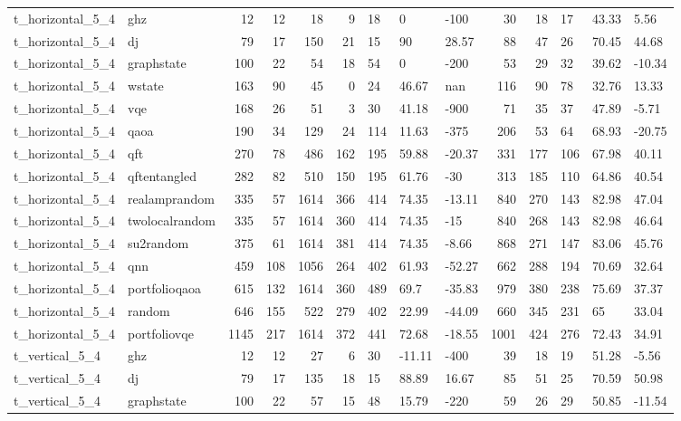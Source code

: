 \begin{longtable}{llrrrrlllrrlll}
t\_horizontal\_5\_4 & ghz & 12 & 12 & 18 & 9 & 18 & 0 & -100 & 30 & 18 & 17 & 43.33 & 5.56 \\
t\_horizontal\_5\_4 & dj & 79 & 17 & 150 & 21 & 15 & 90 & 28.57 & 88 & 47 & 26 & 70.45 & 44.68 \\
t\_horizontal\_5\_4 & graphstate & 100 & 22 & 54 & 18 & 54 & 0 & -200 & 53 & 29 & 32 & 39.62 & -10.34 \\
t\_horizontal\_5\_4 & wstate & 163 & 90 & 45 & 0 & 24 & 46.67 & nan & 116 & 90 & 78 & 32.76 & 13.33 \\
t\_horizontal\_5\_4 & vqe & 168 & 26 & 51 & 3 & 30 & 41.18 & -900 & 71 & 35 & 37 & 47.89 & -5.71 \\
t\_horizontal\_5\_4 & qaoa & 190 & 34 & 129 & 24 & 114 & 11.63 & -375 & 206 & 53 & 64 & 68.93 & -20.75 \\
t\_horizontal\_5\_4 & qft & 270 & 78 & 486 & 162 & 195 & 59.88 & -20.37 & 331 & 177 & 106 & 67.98 & 40.11 \\
t\_horizontal\_5\_4 & qftentangled & 282 & 82 & 510 & 150 & 195 & 61.76 & -30 & 313 & 185 & 110 & 64.86 & 40.54 \\
t\_horizontal\_5\_4 & realamprandom & 335 & 57 & 1614 & 366 & 414 & 74.35 & -13.11 & 840 & 270 & 143 & 82.98 & 47.04 \\
t\_horizontal\_5\_4 & twolocalrandom & 335 & 57 & 1614 & 360 & 414 & 74.35 & -15 & 840 & 268 & 143 & 82.98 & 46.64 \\
t\_horizontal\_5\_4 & su2random & 375 & 61 & 1614 & 381 & 414 & 74.35 & -8.66 & 868 & 271 & 147 & 83.06 & 45.76 \\
t\_horizontal\_5\_4 & qnn & 459 & 108 & 1056 & 264 & 402 & 61.93 & -52.27 & 662 & 288 & 194 & 70.69 & 32.64 \\
t\_horizontal\_5\_4 & portfolioqaoa & 615 & 132 & 1614 & 360 & 489 & 69.7 & -35.83 & 979 & 380 & 238 & 75.69 & 37.37 \\
t\_horizontal\_5\_4 & random & 646 & 155 & 522 & 279 & 402 & 22.99 & -44.09 & 660 & 345 & 231 & 65 & 33.04 \\
t\_horizontal\_5\_4 & portfoliovqe & 1145 & 217 & 1614 & 372 & 441 & 72.68 & -18.55 & 1001 & 424 & 276 & 72.43 & 34.91 \\
t\_vertical\_5\_4 & ghz & 12 & 12 & 27 & 6 & 30 & -11.11 & -400 & 39 & 18 & 19 & 51.28 & -5.56 \\
t\_vertical\_5\_4 & dj & 79 & 17 & 135 & 18 & 15 & 88.89 & 16.67 & 85 & 51 & 25 & 70.59 & 50.98 \\
t\_vertical\_5\_4 & graphstate & 100 & 22 & 57 & 15 & 48 & 15.79 & -220 & 59 & 26 & 29 & 50.85 & -11.54 \\

\end{longtable}

